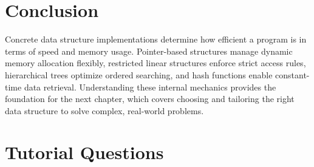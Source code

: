 \documentclass[12pt]{report}
\begin{document}
\section{Conclusion}

Concrete data structure implementations determine how efficient a program is in terms of speed and memory usage. Pointer-based structures manage dynamic memory allocation flexibly, restricted linear structures enforce strict access rules, hierarchical trees optimize ordered searching, and hash functions enable constant-time data retrieval. Understanding these internal mechanics provides the foundation for the next chapter, which covers choosing and tailoring the right data structure to solve complex, real-world problems.

\section*{Tutorial Questions}
\end{document}
